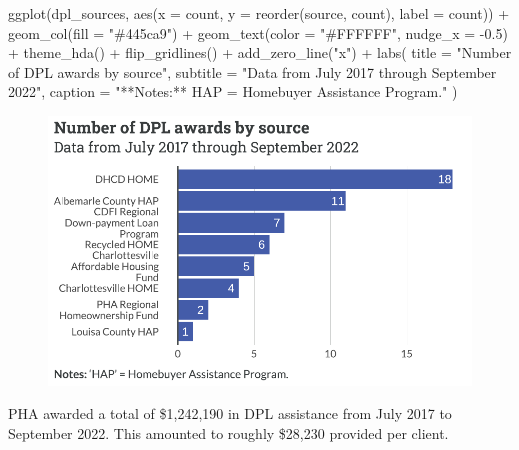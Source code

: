 \documentclass[
  letterpaper,
  DIV=11,
  numbers=noendperiod]{scrartcl}
\newenvironment{Shaded}{\begin{snugshade}}{\end{snugshade}}
\newcommand{\AttributeTok}[1]{\textcolor[rgb]{0.40,0.45,0.13}{#1}}
\newcommand{\FloatTok}[1]{\textcolor[rgb]{0.68,0.00,0.00}{#1}}
\newcommand{\FunctionTok}[1]{\textcolor[rgb]{0.28,0.35,0.67}{#1}}
\newcommand{\NormalTok}[1]{\textcolor[rgb]{0.00,0.23,0.31}{#1}}
\newcommand{\SpecialCharTok}[1]{\textcolor[rgb]{0.37,0.37,0.37}{#1}}
\newcommand{\StringTok}[1]{\textcolor[rgb]{0.13,0.47,0.30}{#1}}
\begin{document}
\begin{Shaded}
\begin{Highlighting}[]
\FunctionTok{ggplot}\NormalTok{(dpl\_sources, }\FunctionTok{aes}\NormalTok{(}\AttributeTok{x =}\NormalTok{ count, }\AttributeTok{y =} \FunctionTok{reorder}\NormalTok{(source, count), }\AttributeTok{label =}\NormalTok{ count)) }\SpecialCharTok{+} 
  \FunctionTok{geom\_col}\NormalTok{(}\AttributeTok{fill =} \StringTok{"\#445ca9"}\NormalTok{) }\SpecialCharTok{+}
  \FunctionTok{geom\_text}\NormalTok{(}\AttributeTok{color =} \StringTok{"\#FFFFFF"}\NormalTok{, }\AttributeTok{nudge\_x =} \SpecialCharTok{{-}}\FloatTok{0.5}\NormalTok{) }\SpecialCharTok{+}
  \FunctionTok{theme\_hda}\NormalTok{() }\SpecialCharTok{+}
  \FunctionTok{flip\_gridlines}\NormalTok{() }\SpecialCharTok{+}
  \FunctionTok{add\_zero\_line}\NormalTok{(}\StringTok{"x"}\NormalTok{) }\SpecialCharTok{+}
  \FunctionTok{labs}\NormalTok{(}
    \AttributeTok{title =} \StringTok{"Number of DPL awards by source"}\NormalTok{,}
    \AttributeTok{subtitle =} \StringTok{"Data from July 2017 through September 2022"}\NormalTok{,}
    \AttributeTok{caption =} \StringTok{"**Notes:** \textquotesingle{}HAP\textquotesingle{} = Homebuyer Assistance Program."}
\NormalTok{  )}
\end{Highlighting}
\end{Shaded}

\begin{figure}[H]

{\centering \includegraphics{piedmont_files/figure-pdf/dpl-sources-1.pdf}

}

\end{figure}

PHA awarded a total of \$1,242,190 in DPL assistance from July 2017 to
September 2022. This amounted to roughly \$28,230 provided per client.
\end{document}
